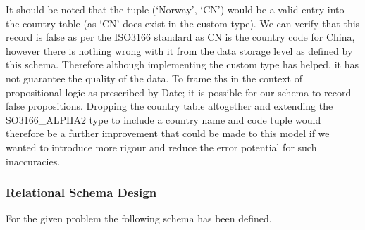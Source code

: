 \documentclass[12pt]{article}
\begin{document}
It should be noted that the tuple (`Norway', `CN') would be a valid entry into the country table (as `CN' does exist in the custom type). We can verify that this record is false as per the ISO3166 standard as CN is the country code for China, however there is nothing wrong with it from the data storage level as defined by this schema. Therefore although implementing the custom type has helped, it has not guarantee the quality of the data. To frame ths in the context of propositional logic as prescribed by Date; it is possible for our schema to record false propositions. Dropping the country table altogether and extending the SO3166\_ALPHA2 type to include a country name and code tuple would therefore be a further improvement that could be made to this model if we wanted to introduce more rigour and reduce the error potential for such inaccuracies.

\subsubsection{Relational Schema Design}
For the given problem the following schema has been defined. \\
\end{document}
